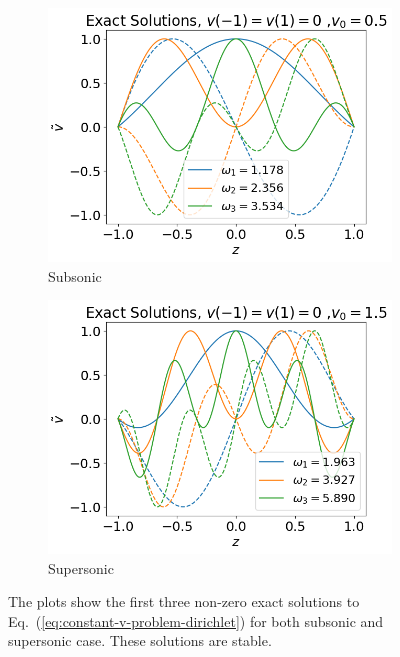 \begin{figure}[htbp]
	\centering
	\begin{subfigure}{0.5\textwidth}
		\includegraphics[width=\linewidth]{figures/exact-fixed-fixed-v0=0.5}
		\caption{Subsonic}
	\end{subfigure}%
	\begin{subfigure}{0.5\textwidth}
		\includegraphics[width=\linewidth]{figures/exact-fixed-fixed-v0=1.5}
		\caption{Supersonic}
	\end{subfigure}
	\caption{The plots show the first three non-zero exact solutions to Eq.~(\ref{eq:constant-v-problem-dirichlet}) for both subsonic and supersonic case. These solutions are stable.}
	\label{fig:exact-v-dirichlet}
\end{figure}


